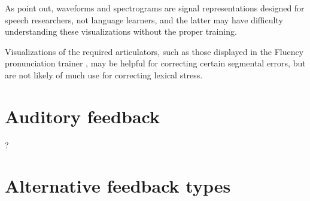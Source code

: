 	As \textcite{Neri2002} point out, waveforms and spectrograms are signal representations designed for speech researchers, not language learners, and the latter may have difficulty understanding these visualizations without the proper training.
	
	Visualizations of the required articulators, such as those displayed in the Fluency pronunciation trainer \citep{Eskenazi2000}, may be helpful for correcting certain segmental errors, but are not likely of much use for correcting lexical stress. 
	
	
\section{Auditory feedback}
\label{sec:fb:auditory}

\citep{Bonneau2011}

\citep{Jilka1998}?

%	
	
	
	
\section{Alternative feedback types}
\label{sec:fb:alternative}

%	
%	


